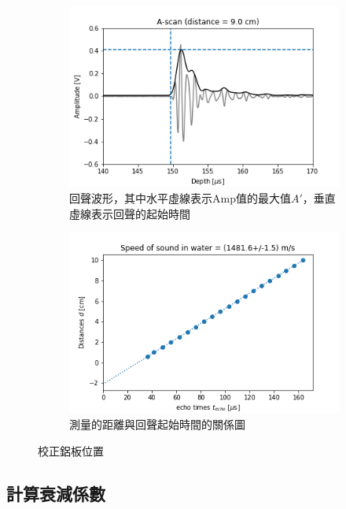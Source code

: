 \documentclass[12pt]{report}
\begin{document}
\begin{figure}[h]
    \centering
    \begin{subfigure}{0.49\textwidth}
        \centering
        \includegraphics[width=\textwidth]{PHY04_ascan.png}
        \caption{回聲波形，其中水平虛線表示Amp值的最大值$A'$，垂直虛線表示回聲的起始時間}
        \label{fig:phy04_ascan}
    \end{subfigure}
    \hfill
    \begin{subfigure}{0.49\textwidth}
        \centering
        \includegraphics[width=\textwidth]{PHY04_speed.png}
        \caption{測量的距離與回聲起始時間的關係圖}
        \label{fig:phy04_speed}
    \end{subfigure}
    \caption{校正鋁板位置}
\end{figure}

\subsection{計算衰減係數}
\end{document}
